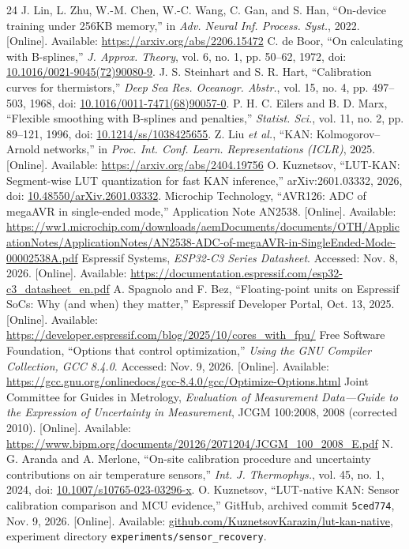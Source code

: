 \begin{thebibliography}{24}
 J. Lin, L. Zhu, W.-M. Chen, W.-C. Wang, C. Gan, and S. Han, ``On-device training under 256KB memory,'' in \emph{Adv. Neural Inf. Process. Syst.}, 2022. [Online]. Available: \url{https://arxiv.org/abs/2206.15472}
 C. de Boor, ``On calculating with B-splines,'' \emph{J. Approx. Theory}, vol. 6, no. 1, pp. 50--62, 1972, doi: \href{https://doi.org/10.1016/0021-9045(72)90080-9}{10.1016/0021-9045(72)90080-9}.
 J. S. Steinhart and S. R. Hart, ``Calibration curves for thermistors,'' \emph{Deep Sea Res. Oceanogr. Abstr.}, vol. 15, no. 4, pp. 497--503, 1968, doi: \href{https://doi.org/10.1016/0011-7471(68)90057-0}{10.1016/0011-7471(68)90057-0}.
 P. H. C. Eilers and B. D. Marx, ``Flexible smoothing with B-splines and penalties,'' \emph{Statist. Sci.}, vol. 11, no. 2, pp. 89--121, 1996, doi: \href{https://doi.org/10.1214/ss/1038425655}{10.1214/ss/1038425655}.
 Z. Liu \emph{et al.}, ``KAN: Kolmogorov--Arnold networks,'' in \emph{Proc. Int. Conf. Learn. Representations (ICLR)}, 2025. [Online]. Available: \url{https://arxiv.org/abs/2404.19756}
 O. Kuznetsov, ``LUT-KAN: Segment-wise LUT quantization for fast KAN inference,'' arXiv:2601.03332, 2026, doi: \href{https://doi.org/10.48550/arXiv.2601.03332}{10.48550/arXiv.2601.03332}.
 Microchip Technology, ``AVR126: ADC of megaAVR in single-ended mode,'' Application Note AN2538. [Online]. Available: \url{https://ww1.microchip.com/downloads/aemDocuments/documents/OTH/ApplicationNotes/ApplicationNotes/AN2538-ADC-of-megaAVR-in-SingleEnded-Mode-00002538A.pdf}
 Espressif Systems, \emph{ESP32-C3 Series Datasheet}. Accessed: Nov. 8, 2026. [Online]. Available: \url{https://documentation.espressif.com/esp32-c3_datasheet_en.pdf}
 A. Spagnolo and F. Bez, ``Floating-point units on Espressif SoCs: Why (and when) they matter,'' Espressif Developer Portal, Oct. 13, 2025. [Online]. Available: \url{https://developer.espressif.com/blog/2025/10/cores_with_fpu/}
 Free Software Foundation, ``Options that control optimization,'' \emph{Using the GNU Compiler Collection, GCC 8.4.0}. Accessed: Nov. 9, 2026. [Online]. Available: \url{https://gcc.gnu.org/onlinedocs/gcc-8.4.0/gcc/Optimize-Options.html}
 Joint Committee for Guides in Metrology, \emph{Evaluation of Measurement Data---Guide to the Expression of Uncertainty in Measurement}, JCGM 100:2008, 2008 (corrected 2010). [Online]. Available: \url{https://www.bipm.org/documents/20126/2071204/JCGM_100_2008_E.pdf}
 N. G. Aranda and A. Merlone, ``On-site calibration procedure and uncertainty contributions on air temperature sensors,'' \emph{Int. J. Thermophys.}, vol. 45, no. 1, 2024, doi: \href{https://doi.org/10.1007/s10765-023-03296-x}{10.1007/s10765-023-03296-x}.
 O. Kuznetsov, ``LUT-native KAN: Sensor calibration comparison and MCU evidence,'' GitHub, archived commit \texttt{5ced774}, Nov. 9, 2026. [Online]. Available: \href{https://github.com/KuznetsovKarazin/lut-kan-native/tree/5ced774e40a94e57220c213499eccd6d2af425b4/experiments/sensor_recovery}{github.com/KuznetsovKarazin/lut-kan-native}, experiment directory \texttt{experiments/sensor\_recovery}.


\end{thebibliography}
